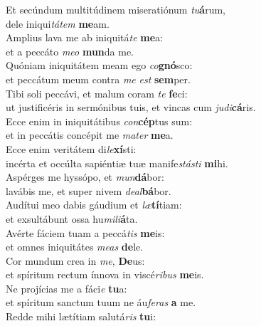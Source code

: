 \evenverse Et secúndum multitúdinem miseratiónum \textit{tu}\textbf{á}rum,~\*\\
\evenverse dele iniqui\textit{tá}\textit{tem} \textbf{me}am.\\
\oddverse Amplius lava me ab iniquitá\textit{te} \textbf{me}a:~\*\\
\oddverse et a peccáto \textit{me}\textit{o} \textbf{mun}da me.\\
\evenverse Quóniam iniquitátem meam ego \textit{co}\textbf{gnó}sco:~\*\\
\evenverse et peccátum meum contra \textit{me} \textit{est} \textbf{sem}per.\\
\oddverse Tibi soli peccávi, et malum coram \textit{te} \textbf{fe}ci:~\*\\
\oddverse ut justificéris in sermónibus tuis, et vincas cum \textit{ju}\textit{di}\textbf{cá}ris.\\
\evenverse Ecce enim in iniquitátibus \textit{con}\textbf{cép}tus sum:~\*\\
\evenverse et in peccátis concépit me \textit{ma}\textit{ter} \textbf{me}a.\\
\oddverse Ecce enim veritátem di\textit{le}\textbf{xí}sti:~\*\\
\oddverse incérta et occúlta sapiéntiæ tuæ manife\textit{stá}\textit{sti} \textbf{mi}hi.\\
\evenverse Aspérges me hyssópo, et \textit{mun}\textbf{dá}bor:~\*\\
\evenverse lavábis me, et super nivem \textit{de}\textit{al}\textbf{bá}bor.\\
\oddverse Audítui meo dabis gáudium et \textit{læ}\textbf{tí}tiam:~\*\\
\oddverse et exsultábunt ossa hu\textit{mi}\textit{li}\textbf{á}ta.\\
\evenverse Avérte fáciem tuam a peccá\textit{tis} \textbf{me}is:~\*\\
\evenverse et omnes iniquitátes \textit{me}\textit{as} \textbf{de}le.\\
\oddverse Cor mundum crea in \textit{me}, \textbf{De}us:~\*\\
\oddverse et spíritum rectum ínnova in viscé\textit{ri}\textit{bus} \textbf{me}is.\\
\evenverse Ne projícias me a fáci\textit{e} \textbf{tu}a:~\*\\
\evenverse et spíritum sanctum tuum ne áu\textit{fe}\textit{ras} \textbf{a} me.\\
\oddverse Redde mihi lætítiam salutá\textit{ris} \textbf{tu}i:~\*\\
